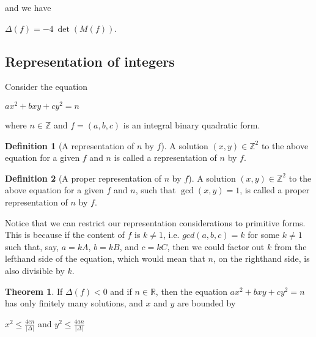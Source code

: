 \documentclass{article}
\theoremstyle{definition}
\newtheorem{definition}{Definition}[section]
\theoremstyle{theorem}
\newtheorem{theorem}{Theorem}[section]
\theoremstyle{example}
\theoremstyle{corollary}
\begin{document}
and we have

\begin{center}
\(\Delta(f) = -4 \ \det(M(f))\).
\end{center}

\bigskip




\subsection{Representation of integers}

\bigskip

Consider the equation
\begin{center}
\(a x^{2} + b x y + c y^{2} = n\)
\end{center}
where \(n \in \mathbb{Z}\) and \(f = (a, b, c)\) is an integral binary quadratic form.

\bigskip

\theoremstyle{definition}
\begin{definition}[A representation of \(n\) by \(f\)]
A solution \((x, y) \in \mathbb{Z}^{2}\) to the above equation for a given \(f\) and \(n\) is called a representation of \(n\) by \(f\).
\end{definition}

\bigskip

\theoremstyle{definition}
\begin{definition}[A proper representation of \(n\) by \(f\)]
A solution \((x, y) \in \mathbb{Z}^{2}\) to the above equation for a given \(f\) and \(n\), such that \(\gcd(x, y) = 1\), is called a proper representation of \(n\) by \(f\).
\end{definition}

\bigskip

Notice that we can restrict our representation considerations to primitive forms. This is because if the content of \(f\) is \(k \ne 1\), i.e. \(gcd(a, b, c) = k\) for some \(k \ne 1\) such that, say, \(a = kA\), \(b = kB\), and \(c = kC\), then we could factor out \(k\) from the lefthand side of the equation, which would mean that \(n\), on the righthand side, is also divisible by \(k\).

\bigskip

\theoremstyle{theorem}
\begin{theorem}
If \(\Delta(f) < 0\) and if \(n \in \mathbb{R}\), then the equation \(ax^{2} + bxy + cy^{2} = n\) has only finitely many solutions, and \(x\) and \(y\) are bounded by
\begin{center}
\(x^{2} \le \frac{4cn}{|\Delta |}\) \quad \quad and \quad \quad \(y^{2} \le \frac{4an}{|\Delta |}\)
\end{center}
\end{theorem}
\end{document}
